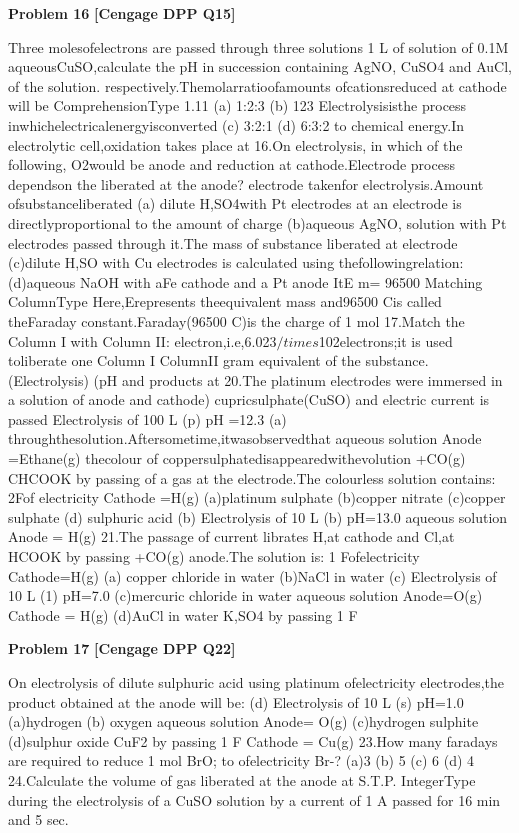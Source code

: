 \begin{problembox}
\textbf{Problem 16} \hfill \textbf{[Cengage DPP Q15]}
\label{q:ext-cng_dpp_all_questions-16}

Three molesofelectrons are passed through three solutions
1 L of solution of 0.1M aqueousCuSO,calculate the pH
in succession containing AgNO, CuSO4 and AuCl,
of the solution.
respectively.Themolarratioofamounts ofcationsreduced
at cathode will be
ComprehensionType
1.11
(a) 1:2:3
(b)
123
Electrolysisisthe process inwhichelectricalenergyisconverted
(c) 3:2:1
(d) 6:3:2
to chemical energy.In electrolytic cell,oxidation takes place at
16.On electrolysis, in which of the following, O2would be
anode and reduction at cathode.Electrode process dependson the
liberated at the anode?
electrode takenfor electrolysis.Amount ofsubstanceliberated
(a) dilute H,SO4with Pt electrodes
at an electrode is directlyproportional to the amount of charge
(b)aqueous AgNO, solution with Pt electrodes
passed through it.The mass of substance liberated at electrode
(c)dilute H,SO with Cu electrodes
is calculated using thefollowingrelation: 
(d)aqueous NaOH with aFe cathode and a Pt anode
ItE
m=
96500
Matching ColumnType
Here,Erepresents theequivalent mass and96500 Cis called
theFaraday constant.Faraday(96500 C)is the charge of 1 mol
17.Match the Column I with Column II:
electron,i.e,6.023$/times$102electrons;it is used toliberate one
Column I
ColumnII
gram equivalent of the substance.
(Electrolysis)
(pH and products at
20.The platinum electrodes were immersed in a solution of
anode and cathode)
cupricsulphate(CuSO) and electric current is passed
Electrolysis of 100 L
(p)
pH =12.3
(a)
throughthesolution.Aftersometime,itwasobservedthat
aqueous solution
Anode =Ethane(g)
thecolour of coppersulphatedisappearedwithevolution
+CO(g)
CHCOOK by passing
of a gas at the electrode.The colourless solution contains:
2Fof electricity
Cathode =H(g)
(a)platinum sulphate
(b)copper nitrate
(c)copper sulphate
(d) sulphuric acid
(b)
Electrolysis of 10 L
(b)
pH=13.0
aqueous solution
Anode = H(g)
21.The passage of current librates H,at cathode and Cl,at
HCOOK by passing
+CO(g)
anode.The solution is:
1 Fofelectricity
Cathode=H(g)
(a) copper chloride in water
(b)NaCl in water
(c)
Electrolysis of 10 L
(1)
pH=7.0
(c)mercuric chloride in water
aqueous solution
Anode=O(g)
Cathode = H(g)
(d)AuCl in water
K,SO4 by passing 1 F
\end{problembox}

\begin{problembox}
\textbf{Problem 17} \hfill \textbf{[Cengage DPP Q22]}
\label{q:ext-cng_dpp_all_questions-17}

On electrolysis of dilute sulphuric acid using platinum
ofelectricity
electrodes,the product obtained at the anode will be:
(d)
Electrolysis of 10 L
(s)
pH=1.0
(a)hydrogen
(b) oxygen
aqueous solution
Anode= O(g)
(c)hydrogen sulphite
(d)sulphur oxide
CuF2 by passing 1 F
Cathode = Cu(g)
23.How many faradays are required to reduce 1 mol BrO; to
ofelectricity
Br-?
(a)3
(b) 5
(c) 6
(d) 4
24.Calculate the volume of gas liberated at the anode at S.T.P.
IntegerType
during the electrolysis of a CuSO solution by a current of
1 A passed for 16 min and 5 sec.
\end{problembox}


